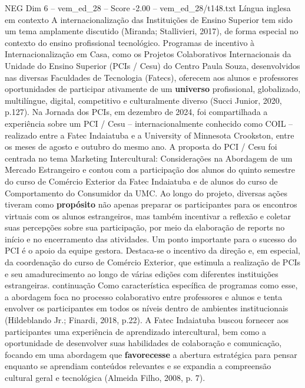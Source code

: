 \begin{textsample}{NEG Dim 6 – vem\_ed\_28 – Score -2.00 – vem\_ed\_28/t148.txt}  \label{ex:f6_neg_136}
Língua inglesa em contexto A internacionalização das Instituições de Ensino Superior tem sido um tema amplamente discutido (Miranda; Stallivieri, 2017), de forma especial no contexto do ensino profissional tecnológico.
Programas de incentivo à Internacionalização em Casa, como os Projetos Colaborativos Internacionais da Unidade do Ensino Superior (PCIs / Cesu) do Centro Paula Souza, desenvolvidos nas diversas Faculdades de Tecnologia (Fatecs), oferecem aos alunos e professores oportunidades de participar ativamente de um \textbf{universo} profissional, globalizado, multilíngue, digital, competitivo e culturalmente diverso (Succi Junior, 2020, p.127).
Na Jornada dos PCIs, em dezembro de 2024, foi compartilhada a experiência sobre um PCI / Cesu – internacionalmente conhecido como COIL – realizado entre a Fatec Indaiatuba e a University of Minnesota Crookston, entre os meses de agosto e outubro do mesmo ano.
A proposta do PCI / Cesu foi centrada no tema Marketing Intercultural: Considerações na Abordagem de um Mercado Estrangeiro e contou com a participação dos alunos do quinto semestre do curso de Comércio Exterior da Fatec Indaiatuba e de alunos do curso de Comportamento do Consumidor da UMC.
Ao longo do projeto, diversas ações tiveram como \textbf{propósito} não apenas preparar os participantes para os encontros virtuais com os alunos estrangeiros, mas também incentivar a reflexão e coletar suas percepções sobre sua participação, por meio da elaboração de reports no início e no encerramento das atividades.
Um ponto importante para o sucesso do PCI é o apoio da equipe gestora.
Destaca-se o incentivo da direção e, em especial, da coordenação do curso de Comércio Exterior, que estimula a realização de PCIs e seu amadurecimento ao longo de várias edições com diferentes instituições estrangeiras. continuação Como característica específica de programas como esse, a abordagem foca no processo colaborativo entre professores e alunos e tenta envolver os participantes em todos os níveis dentro de ambientes institucionais (Hildeblando Jr.; Finardi, 2018, p.22).
A Fatec Indaiatuba buscou fornecer aos participantes uma experiência de aprendizado intercultural, bem como a oportunidade de desenvolver suas habilidades de colaboração e comunicação, focando em uma abordagem que \textbf{favorecesse} a abertura estratégica para pensar enquanto se aprendiam conteúdos relevantes e se expandia a compreensão cultural geral e tecnológica (Almeida Filho, 2008, p. 7).

\end{textsample}
